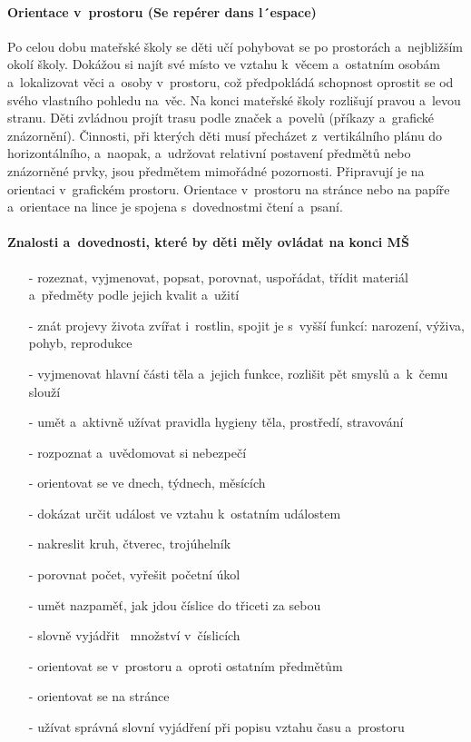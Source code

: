 			\paragraph{Orientace v prostoru (Se repérer dans l´espace)}
				Po celou dobu mateřské školy se děti učí pohybovat se po prostorách a~nejbližším okolí školy. Dokážou si najít své místo ve vztahu k věcem a~ostatním osobám a~lokalizovat věci a~osoby v~prostoru, což předpokládá schopnost oprostit se od svého vlastního pohledu na věc. Na konci mateřské školy rozlišují pravou a~levou stranu. Děti zvládnou projít trasu podle značek a~povelů (příkazy a~grafické znázornění).
				Činnosti, při kterých děti musí přecházet z vertikálního plánu do horizontálního, a~naopak, a udržovat relativní postavení předmětů nebo znázorněné prvky, jsou předmětem mimořádné pozornosti. Připravují je na orientaci v grafickém prostoru. Orientace v prostoru na stránce nebo na papíře a~orientace na lince je spojena s dovednostmi čtení a psaní. 
			\paragraph{Znalosti a~dovednosti, které by děti měly ovládat na konci MŠ}
				\vspace{-2mm}
				\begin{itemize}
					\setlength\itemsep{-2mm}
					\item[-] rozeznat, vyjmenovat, popsat, porovnat, uspořádat, třídit materiál a~předměty podle jejich kvalit a~užití
					\item[-] znát projevy života zvířat i~rostlin, spojit je s vyšší funkcí: narození, výživa, pohyb, reprodukce
					\item[-] vyjmenovat hlavní části těla a~jejich funkce, rozlišit pět smyslů a~k čemu slouží
					\item[-] umět a~aktivně užívat pravidla hygieny těla, prostředí, stravování
					\item[-] rozpoznat a~uvědomovat si nebezpečí
					\item[-] orientovat se ve dnech, týdnech, měsících
					\item[-] dokázat určit událost ve vztahu k ostatním událostem
					\item[-] nakreslit kruh, čtverec, trojúhelník
					\item[-] porovnat počet, vyřešit početní úkol
					\item[-] umět nazpaměť, jak jdou číslice do třiceti za sebou 
					\item[-] slovně vyjádřit  množství v~číslicích 
					\item[-] orientovat se v prostoru a~oproti ostatním předmětům
					\item[-] orientovat se na stránce
					\item[-] užívat správná slovní vyjádření při popisu vztahu času a~prostoru
				\end{itemize}

